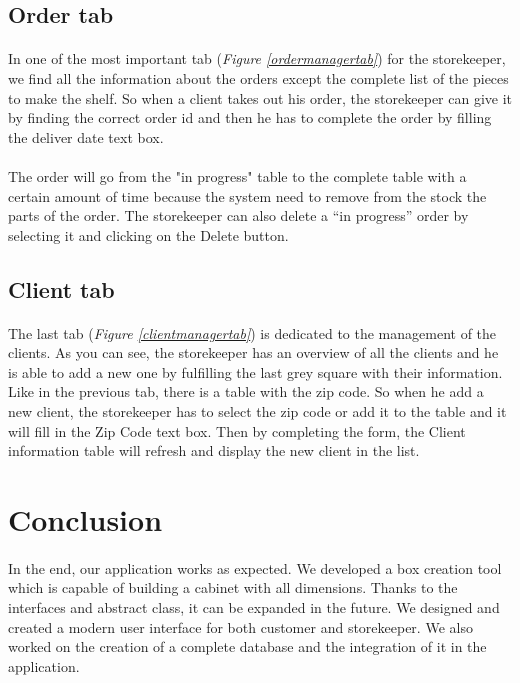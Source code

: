 \documentclass[12pt,oneside]{report}
\begin{document}
    \subsection{Order tab}
        \paragraph{}
        In one of the most important tab (\textit{Figure \ref{ordermanagertab}}) for the storekeeper, we find all the information about the orders except the complete list of the pieces to make the shelf. So when a client takes out his order, the storekeeper can give it by finding the correct order id and then he has to complete the order by filling the deliver date text box.
        
        \paragraph{}
        The order will go from the "in progress" table to the complete table with a certain amount of time because the system need to remove from the stock the parts of the order. The storekeeper can also delete a “in progress” order by selecting it and clicking on the Delete button.
        
    
    \newpage
    \subsection{Client tab}
        \paragraph{}
        The last tab (\textit{Figure \ref{clientmanagertab}}) is dedicated to the management of the clients. As you can see, the storekeeper has an overview of all the clients and he is able to add a new one by fulfilling the last grey square with their information. Like in the previous tab, there is a table with the zip code. So when he add a new client, the storekeeper has to select the zip code or add it to the table and it will fill in the Zip Code text box. Then by completing the form, the Client information table will refresh and display the new client in the list.
        
\newpage
\section{Conclusion}
    \paragraph{}
    In the end, our application works as expected. We developed a box creation tool which is capable of building a cabinet with all dimensions. Thanks to the interfaces and abstract class, it can be expanded in the future. We designed and created a modern user interface for both customer and  storekeeper. We also worked on the creation of a complete database and the integration of it in the application.
    
\end{document}
